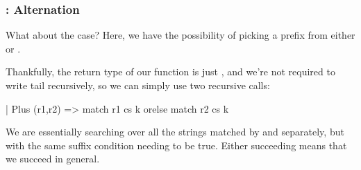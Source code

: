 \documentclass[aspectratio=169, handout]{beamer}
\begin{document}
\begin{frame}[fragile]
  \frametitle{: Alternation}

  What about the  case? Here, we have the possibility of
  picking a prefix from either  or .

  \pause
  \vspace{\fill}

  Thankfully, the return type of our function  is just ,
  and we're not required to write  tail recursively, so we can
  simply use two recursive calls:

  \begin{codeblock}
    | Plus (r1,r2) => match r1 cs k orelse match r2 cs k
  \end{codeblock}

  \pause
  \vspace{\fill}

  We are essentially searching over all the strings matched by  and
   separately, but with the same suffix condition needing to be true.
  Either succeeding means that we succeed in general.
\end{frame}
\end{document}
